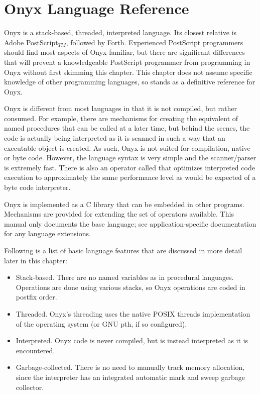 %
%
%
%
%

\clearemptydoublepage
\chapter{Onyx Language Reference}
\label{onyxlang}

Onyx is a stack-based, threaded, interpreted language.  Its closest relative is
Adobe PostScript$_{TM}$, followed by Forth.  Experienced PostScript programmers
should find most aspects of Onyx familiar, but there are significant differences
that will prevent a knowledgeable PostScript programmer from programming in Onyx
without first skimming this chapter.  This chapter does not assume specific
knowledge of other programming languages, so stands as a definitive reference
for Onyx.

Onyx is different from most languages in that it is not compiled, but rather
consumed.  For example, there are mechanisms for creating the equivalent of
named procedures that can be called at a later time, but behind the scenes, the
code is actually being interpreted as it is scanned in such a way that an
executable object is created.  As such, Onyx is not suited for compilation,
native or byte code.  However, the language syntax is very simple and the
scanner/parser is extremely fast.  There is also an operator called
 that optimizes interpreted code
execution to approximately the same performance level as would be expected of a
byte code interpreter.

Onyx is implemented as a C library that can be embedded in other programs.
Mechanisms are provided for extending the set of operators available.  This
manual only documents the base language; see application-specific documentation
for any language extensions.

Following is a list of basic language features that are discussed in more detail
later in this chapter:

\begin{itemize}
\item{Stack-based.  There are no named variables as in procedural languages.
Operations are done using various stacks, so Onyx operations are coded in
postfix order.}
\item{Threaded.  Onyx's threading uses the native POSIX threads implementation
of the operating system (or GNU pth, if so configured).}
\item{Interpreted.  Onyx code is never compiled, but is instead interpreted as
it is encountered.}
\item{Garbage-collected.  There is no need to manually track memory allocation,
since the interpreter has an integrated automatic mark and sweep garbage
collector.}
\end{itemize}

